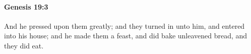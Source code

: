 
		\paragraph{Genesis 19:3} %
			\label{GENESIS-19-3}

			And he pressed upon them greatly; and they turned in unto him, and entered into his house; and he made them a feast, and did bake unleavened bread, and they did eat.


